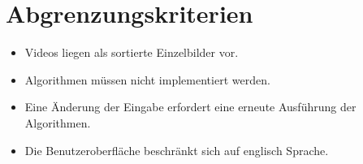 \section{Abgrenzungskriterien}
\begin{itemize}
	\item Videos liegen als sortierte Einzelbilder vor.
	\item Algorithmen müssen nicht implementiert werden.
	\item Eine Änderung der Eingabe erfordert eine erneute Ausführung der Algorithmen.
	\item Die Benutzeroberfläche beschränkt sich auf englisch Sprache.
\end{itemize}
